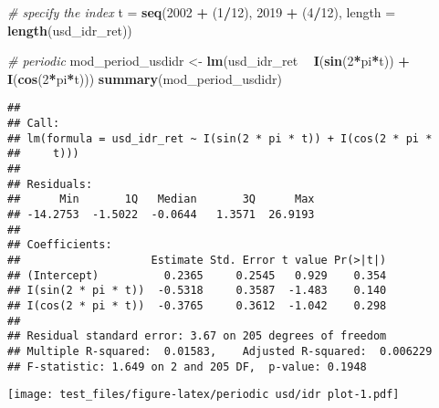 \documentclass[]{article}
\newenvironment{Shaded}{\begin{snugshade}}{\end{snugshade}}
\newcommand{\KeywordTok}[1]{\textcolor[rgb]{0.13,0.29,0.53}{\textbf{#1}}}
\newcommand{\DataTypeTok}[1]{\textcolor[rgb]{0.13,0.29,0.53}{#1}}
\newcommand{\DecValTok}[1]{\textcolor[rgb]{0.00,0.00,0.81}{#1}}
\newcommand{\StringTok}[1]{\textcolor[rgb]{0.31,0.60,0.02}{#1}}
\newcommand{\CommentTok}[1]{\textcolor[rgb]{0.56,0.35,0.01}{\textit{#1}}}
\newcommand{\OperatorTok}[1]{\textcolor[rgb]{0.81,0.36,0.00}{\textbf{#1}}}
\newcommand{\NormalTok}[1]{#1}
\begin{document}
\begin{Shaded}
\begin{Highlighting}[]
\CommentTok{# specify the index}
\NormalTok{t =}\StringTok{ }\KeywordTok{seq}\NormalTok{(}\DecValTok{2002} \OperatorTok{+}\StringTok{ }\NormalTok{(}\DecValTok{1}\OperatorTok{/}\DecValTok{12}\NormalTok{), }\DecValTok{2019} \OperatorTok{+}\StringTok{ }\NormalTok{(}\DecValTok{4}\OperatorTok{/}\DecValTok{12}\NormalTok{), }\DataTypeTok{length =} \KeywordTok{length}\NormalTok{(usd_idr_ret))}

\CommentTok{# periodic}
\NormalTok{mod_period_usdidr <-}\StringTok{ }\KeywordTok{lm}\NormalTok{(usd_idr_ret }\OperatorTok{~}\StringTok{ }\KeywordTok{I}\NormalTok{(}\KeywordTok{sin}\NormalTok{(}\DecValTok{2}\OperatorTok{*}\NormalTok{pi}\OperatorTok{*}\NormalTok{t)) }\OperatorTok{+}\StringTok{ }\KeywordTok{I}\NormalTok{(}\KeywordTok{cos}\NormalTok{(}\DecValTok{2}\OperatorTok{*}\NormalTok{pi}\OperatorTok{*}\NormalTok{t)))}
\KeywordTok{summary}\NormalTok{(mod_period_usdidr)}
\end{Highlighting}
\end{Shaded}

\begin{verbatim}
## 
## Call:
## lm(formula = usd_idr_ret ~ I(sin(2 * pi * t)) + I(cos(2 * pi * 
##     t)))
## 
## Residuals:
##      Min       1Q   Median       3Q      Max 
## -14.2753  -1.5022  -0.0644   1.3571  26.9193 
## 
## Coefficients:
##                    Estimate Std. Error t value Pr(>|t|)
## (Intercept)          0.2365     0.2545   0.929    0.354
## I(sin(2 * pi * t))  -0.5318     0.3587  -1.483    0.140
## I(cos(2 * pi * t))  -0.3765     0.3612  -1.042    0.298
## 
## Residual standard error: 3.67 on 205 degrees of freedom
## Multiple R-squared:  0.01583,    Adjusted R-squared:  0.006229 
## F-statistic: 1.649 on 2 and 205 DF,  p-value: 0.1948
\end{verbatim}

\begin{Shaded}
\end{Shaded}

\texttt{[image: test\_files/figure-latex/periodic usd/idr plot-1.pdf]}
\end{document}
